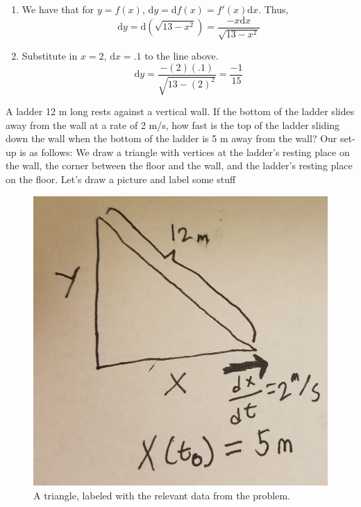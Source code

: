 \documentclass[11pt]{exam}
\renewcommand{\d}{\mathrm{d}}
\begin{document}
\begin{questions}
\vskip10mm
\begin{enumerate}[label=(\alph*)]
	\item We have that for $y=f(x)$, $\d y=\d f(x)=f'(x)\d x$. Thus, $$\d y=\d(\sqrt{13-x^2})=\frac{-x\d x}{\sqrt{13-x^2}}$$
	\item Substitute in $x=2$, $\d x=.1$ to the line above.
	$$\d y=\frac{-(2)(.1)}{\sqrt{13-(2)^2}}=\frac{-1}{15}$$
\end{enumerate}
\vskip15mm
\addpoints
\question[4] A ladder 12 m long rests against a vertical wall. If the bottom of the ladder slides away from the wall at a rate of 2 m/s, how fast is the top of the ladder sliding down the wall when the bottom of the ladder is 5 m away from the wall?
Our set-up is as follows: We draw a triangle with vertices at the ladder's resting place on the wall, the corner between the floor and the wall, and the ladder's resting place on the floor.
Let's draw a picture and label some stuff
\begin{figure}[h!]\centering
	\includegraphics[scale=.1]{q6p3}\caption{A triangle, labeled with the relevant data from the problem.}
\end{figure} 


\end{questions}
\end{document}
